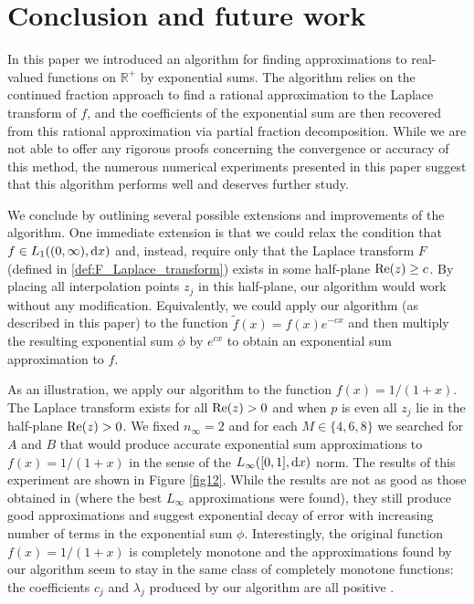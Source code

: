 \documentclass[12pt]{article}
\def\re{\textnormal {Re}}
\def\r{{\mathbb R}}
\def\d{{\textnormal d}}
\begin{document}
\section{Conclusion and future work}\label{Section_conclusion}

In this paper we introduced an algorithm for finding approximations to real-valued functions on $\r^+$ by exponential sums. The algorithm relies on the continued fraction approach to find a rational approximation to the Laplace transform of $f$, and the coefficients of the exponential sum are then recovered from this rational approximation via partial fraction decomposition. While we are not able to offer any rigorous proofs concerning the convergence or accuracy of this method, the numerous numerical experiments presented in this paper suggest that this algorithm performs well and deserves further study. 

We conclude by outlining several possible extensions and improvements of the algorithm. One immediate extension is that we could relax the condition that  $f \in L_1((0,\infty), \d x)$ and, instead, require only that the Laplace transform $F$ (defined in \eqref{def:F_Laplace_transform}) exists in some half-plane $\re(z)\ge c$. By placing all interpolation points $z_j$ in this half-plane, our algorithm would work without any modification. Equivalently, we could apply our algorithm (as described in this paper) to the function $\tilde f(x)=f(x) e^{-c x}$ and then multiply the resulting exponential sum $\phi$ by $e^{c x}$ to obtain an exponential sum approximation to $f$. 

As an illustration, we apply our algorithm to the function $f(x)=1/(1+x)$. The Laplace transform exists for all $\re(z)>0$ and when $p$ is even all $z_j$ lie in the half-plane $\re(z)>0$. We fixed $n_{\infty}=2$ and for each $M\in \{4,6,8\}$ we searched for $A$ and $B$ that would produce accurate exponential sum approximations to $f(x)=1/(1+x)$ in the sense of the $L_{\infty}([0,1],\d x)$ norm. The results of this experiment are shown in Figure \ref{fig12}. While the results are not as good as those obtained in \cite{Hackbusch_2019} (where the best $L_{\infty}$ approximations were found), 
they still produce good approximations and suggest exponential decay of error with increasing number of terms in the exponential sum $\phi$. Interestingly, the original function $f(x)=1/(1+x)$ is completely monotone and the approximations found by our algorithm seem to stay in the same class of completely monotone functions: the coefficients $c_j$ and $\lambda_j$ produced by our algorithm are all positive . 
\end{document}
